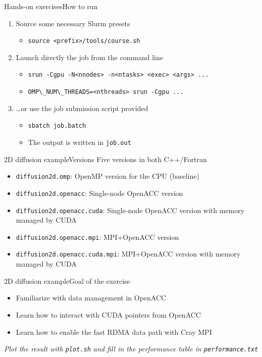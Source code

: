 \documentclass[aspectratio=169,12pt]{beamer}
\newcommand\shinline[2][]{\lstinline[style=shstyle,basicstyle=\ttfamily,#1]!#2!}
\begin{document}
\begin{frame}[fragile]{Hands-on exercises}{How to run}
  \begin{enumerate}
  \item Source some necessary Slurm presets
    \begin{itemize}
    \item \shinline{source <prefix>/tools/course.sh}
    \end{itemize}
  \item Launch directly the job from the command line
    \begin{itemize}
    \item \shinline{srun -Cgpu -N<nnodes> -n<ntasks> <exec> <args> ...}
    \item \shinline{OMP\_NUM\_THREADS=<nthreads> srun -Cgpu ...}
    \end{itemize}
  \item \dots or use the job submission script provided
    \begin{itemize}
    \item \shinline{sbatch job.batch}
    \item The output is written in \shinline{job.out}
    \end{itemize}
  \end{enumerate}
\end{frame}

\begin{frame}[fragile]{2D diffusion example}{Versions}
  Five versions in both C++/Fortran
  \vspace\baselineskip
  \begin{itemize}
  \item \shinline{diffusion2d.omp}: OpenMP version for the CPU (baseline)
  \item \shinline{diffusion2d.openacc}: Single-node OpenACC version
  \item \shinline{diffusion2d.openacc.cuda}: Single-node OpenACC version with memory managed by CUDA
  \item \shinline{diffusion2d.openacc.mpi}: MPI+OpenACC version
  \item \shinline{diffusion2d.openacc.cuda.mpi}: MPI+OpenACC version with memory managed by CUDA
  \end{itemize}
\end{frame}

\begin{frame}[fragile]{2D diffusion example}{Goal of the exercise}
  \begin{itemize}
  \item Familiarize with data management in OpenACC
  \item Learn how to interact with CUDA pointers from OpenACC
  \item Learn how to enable the fast RDMA data path with Cray MPI
  \end{itemize}
  \vfill
  \emph{Plot the result with \shinline{plot.sh} and fill in the performance table in \shinline{performance.txt}}

\end{frame}
\end{document}
